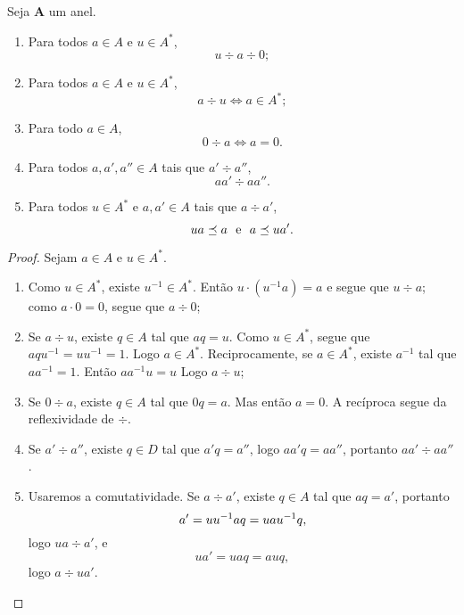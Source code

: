 \begin{prop}
Seja $\bm A$ um anel.
	\begin{enumerate}
	\item Para todos $a \in A$ e $u \in A^*$,
		\begin{equation*}
		u \div a \div 0;
		\end{equation*}
	\item Para todos $a \in A$ e $u \in A^*$,
		\begin{equation*}
		a \div u \Leftrightarrow a \in A^*;
		\end{equation*}
	\item Para todo $a \in A$,
		\begin{equation*}
		0 \div a \Leftrightarrow a=0.
		\end{equation*}
	\item Para todos $a,a',a'' \in A$ tais que $a' \div a''$,
		\begin{equation*}
		aa' \div aa''.
		\end{equation*}
	\item Para todos $u \in A^*$ e $a,a' \in A$ tais que $a \div a'$,
		\begin{equation*}
		ua \preceq a \text{\ \ e\ \ } a \preceq ua'.
		\end{equation*}
	\end{enumerate}
\end{prop}
\begin{proof} Sejam $a \in A$ e $u \in A^*$.
	\begin{enumerate}
	\item Como $u \in A^*$, existe $u^{-1} \in A^*$. Então $u\cdot(u^{-1}a) = a$ e segue que $u \div a$; como $a \cdot 0 = 0$, segue que $a \div 0$;
	\item Se $a \div u$, existe $q \in A$ tal que $aq=u$. Como $u \in A^*$, segue que $aqu^{-1}=uu^{-1}=1$. Logo $a \in A^*$. Reciprocamente, se $a \in A^*$, existe $a^{-1}$ tal que $aa^{-1}=1$. Então $aa^{-1}u=u$ Logo $a \div u$;
	\item Se $0 \div a$, existe $q \in A$ tal que $0q=a$. Mas então $a=0$. A recíproca segue da reflexividade de $\div$.
	\item Se $a' \div a''$, existe $q \in D$ tal que $a'q=a''$, logo $aa'q=aa''$, portanto $aa' \div aa''$.
	\item Usaremos a comutatividade. Se $a \div a'$, existe $q \in A$ tal que $aq=a'$, portanto
		\begin{equation*}
		a' = uu^{-1} aq = uau^{-1} q,
		\end{equation*}
logo $ua \div a'$, e
		\begin{equation*}
		ua' = uaq = auq,
		\end{equation*}
logo $a \div ua'$.
	 \qedhere
	\end{enumerate}
\end{proof}

